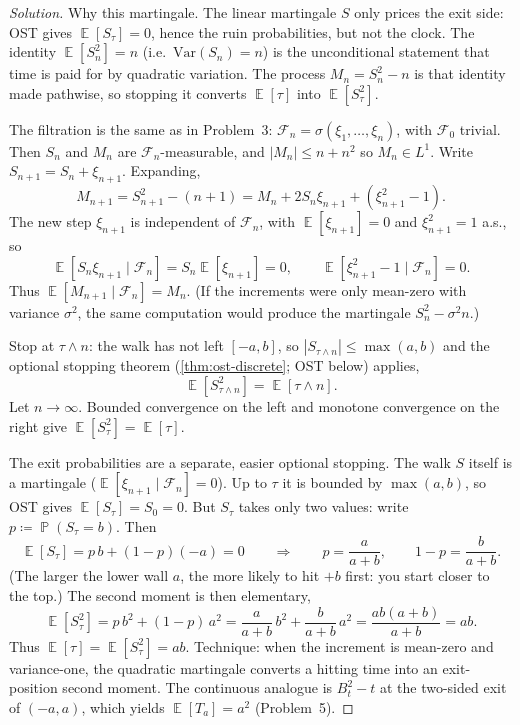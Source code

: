 \documentclass[11pt,a4paper]{article}
\DeclareMathOperator{\E}{\mathbb{E}}
\DeclareMathOperator{\Pbb}{\mathbb{P}}
\begin{document}
\begin{proof}[Solution]
Why this martingale. The linear martingale \( S \) only prices the exit side: OST gives \( \E[S_{\tau}]=0 \), hence the ruin probabilities, but not the clock. The identity \( \E[S_n^{2}]=n \) (i.e.\ \( \mathrm{Var}(S_n)=n \)) is the unconditional statement that time is paid for by quadratic variation. The process \( M_n=S_n^{2}-n \) is that identity made pathwise, so stopping it converts \( \E[\tau] \) into \( \E[S_{\tau}^{2}] \).

The filtration is the same as in Problem~3: \( \mathcal{F}_n=\sigma(\xi_1,\dots,\xi_n) \), with \( \mathcal{F}_0 \) trivial. Then \( S_n \) and \( M_n \) are \( \mathcal{F}_n \)-measurable, and \( |M_n|\le n+n^{2} \) so \( M_n\in L^{1} \). Write \( S_{n+1}=S_n+\xi_{n+1} \). Expanding,
\[
M_{n+1}
=
S_{n+1}^{2}-(n+1)
=
M_n+2S_n\xi_{n+1}+(\xi_{n+1}^{2}-1).
\]
The new step \( \xi_{n+1} \) is independent of \( \mathcal{F}_n \), with \( \E[\xi_{n+1}]=0 \) and \( \xi_{n+1}^{2}=1 \) a.s., so
\[
\E[S_n\xi_{n+1}\mid\mathcal{F}_n]
=
S_n\E[\xi_{n+1}]
=
0,
\qquad
\E[\xi_{n+1}^{2}-1\mid\mathcal{F}_n]
=
0.
\]
Thus \( \E[M_{n+1}\mid\mathcal{F}_n]=M_n \). (If the increments were only mean-zero with variance \( \sigma^{2} \), the same computation would produce the martingale \( S_n^{2}-\sigma^{2}n \).)

Stop at \( \tau\wedge n \): the walk has not left \( [-a,b] \), so \( |S_{\tau\wedge n}|\le\max(a,b) \) and the optional stopping theorem (\cref{thm:ost-discrete}; OST below) applies,
\[
\E[S_{\tau\wedge n}^{2}]
=
\E[\tau\wedge n].
\]
Let \( n\to\infty \). Bounded convergence on the left and monotone convergence on the right give \( \E[S_{\tau}^{2}]=\E[\tau] \).

The exit probabilities are a separate, easier optional stopping. The walk \( S \) itself is a martingale (\( \E[\xi_{n+1}\mid\mathcal{F}_n]=0 \)). Up to \( \tau \) it is bounded by \( \max(a,b) \), so OST gives \( \E[S_{\tau}]=S_0=0 \). But \( S_{\tau} \) takes only two values: write \( p\coloneqq\Pbb(S_{\tau}=b) \). Then
\[
\E[S_{\tau}]
=
p\,b+(1-p)(-a)
=
0
\qquad\Longrightarrow\qquad
p=\frac{a}{a+b},
\qquad
1-p=\frac{b}{a+b}.
\]
(The larger the lower wall \( a \), the more likely to hit \( +b \) first: you start closer to the top.) The second moment is then elementary,
\[
\E[S_{\tau}^{2}]
=
p\,b^{2}+(1-p)\,a^{2}
=
\frac{a}{a+b}\,b^{2}+\frac{b}{a+b}\,a^{2}
=
\frac{ab(a+b)}{a+b}
=
ab.
\]
Thus \( \E[\tau]=\E[S_{\tau}^{2}]=ab \). Technique: when the increment is mean-zero and variance-one, the quadratic martingale converts a hitting time into an exit-position second moment. The continuous analogue is \( B_t^{2}-t \) at the two-sided exit of \( (-a,a) \), which yields \( \E[T_a]=a^{2} \) (Problem~5).
\end{proof}
\end{document}
